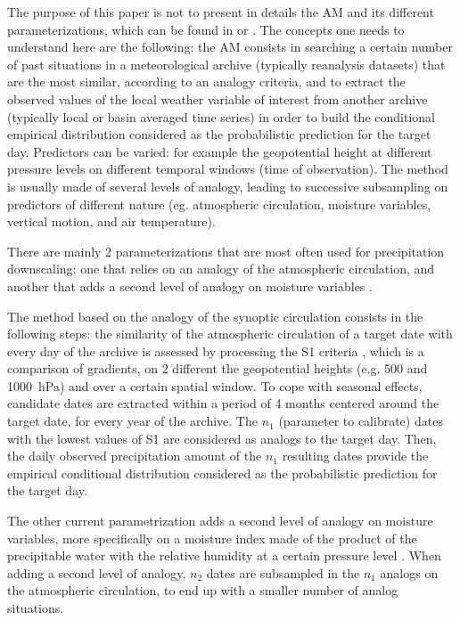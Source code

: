 \documentclass{ametsoc}
\begin{document}
The purpose of this paper is not to present in details the AM and its different parameterizations, which can be found in \citet{Horton2016} or \citet{BenDaoud2015}. The concepts one needs to understand here are the following: the AM consists in searching a certain number of past situations in a meteorological archive (typically reanalysis datasets) that are the most similar, according to an analogy criteria, and to extract the observed values of the local weather variable of interest from another archive (typically local or basin averaged time series) in order to build the conditional empirical distribution considered as the probabilistic prediction for the target day. Predictors can be varied: for example the geopotential height at different pressure levels on different temporal windows (time of observation). The method is usually made of several levels of analogy, leading to successive subsampling on predictors of different nature (eg. atmospheric circulation, moisture variables, vertical motion, and air temperature).

There are mainly 2 parameterizations that are most often used for precipitation downscaling: one that relies on an analogy of the atmospheric circulation, and another that adds a second level of analogy on moisture variables \citep{Obled2002, Bontron2005, Marty2012}.

The method based on the analogy of the synoptic circulation consists in the following steps: the similarity of the atmospheric circulation of a target date with every day of the archive is assessed by processing the S1 criteria \citep{Teweles1954, Drosdowsky2003}, which is a comparison of gradients, on 2 different the geopotential heights (e.g. 500 and 1000~hPa) and over a certain spatial window. To cope with seasonal effects, candidate dates are extracted within a period of 4 months centered around the target date, for every year of the archive. The $n_{1}$ (parameter to calibrate) dates with the lowest values of S1 are considered as analogs to the target day. Then, the daily observed precipitation amount of the $n_{1}$ resulting dates provide the empirical conditional distribution considered as the probabilistic prediction for the target day.

The other current parametrization adds a second level of analogy on moisture variables, more specifically on a moisture index made of the product of the precipitable water with the relative humidity at a certain pressure level \citep[e.g. 850~hPa, see][]{Bontron2004}. When adding a second level of analogy, $n_{2}$ dates are subsampled in the $n_{1}$ analogs on the atmospheric circulation, to end up with a smaller number of analog situations.
\end{document}
